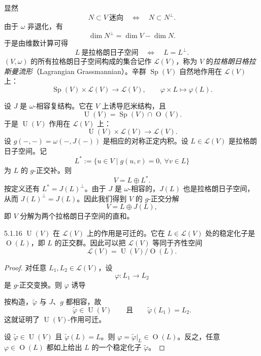 显然
\[
N\subset V\ \text{迷向}\quad\Longleftrightarrow\quad N\subset N^\perp.
\]
由于 $\omega$ 非退化，有
\[
\dim N^\perp=\dim V-\dim N.
\]
于是由维数计算可得
\[
L\ \text{是拉格朗日子空间}\quad\Longleftrightarrow\quad L=L^\perp.
\]
$(V,\omega)$ 的所有拉格朗日子空间构成的集合记作 $\mathcal{L}(V)$，称为 $V$ 的\emph{拉格朗日格拉斯曼流形}（Lagrangian Grassmannian）。辛群 $\operatorname{Sp}(V)$ 自然地作用在 $\mathcal{L}(V)$ 上：
\[
\operatorname{Sp}(V)\times\mathcal{L}(V)\longrightarrow\mathcal{L}(V),\qquad \varphi\times L\longmapsto\varphi(L).
\]


设 $J$ 是 $\omega$-相容复结构。它在 $V$ 上诱导厄米结构，且
\[
\operatorname{U}(V)=\operatorname{Sp}(V)\cap\operatorname{O}(V).
\]
于是 $\operatorname{U}(V)$ 作用在 $\mathcal{L}(V)$ 上：
\[
\operatorname{U}(V)\times\mathcal{L}(V)\longrightarrow\mathcal{L}(V).
\]
设 $g(-,-)=\omega(-,J(-))$ 是相应的对称正定内积。设 $L\in\mathcal{L}(V)$ 是拉格朗日子空间。记
\[
L^*:=\{u\in V\mid g(u,v)=0,\ \forall v\in L\}
\]
为 $L$ 的 $g$-正交补。则
\[
V=L\oplus L^*.
\]
按定义还有 $L^*=J(L)^\perp$。由于 $J$ 是 $\omega$-相容的，$J(L)$ 也是拉格朗日子空间，从而 $J(L)^\perp=J(L)$。因此我们得到 $V$ 的 $g$-正交分解
\[
V=L\oplus J(L),
\]
即 $V$ 分解为两个拉格朗日子空间的直和。

\begin{proposition}{5.1.16}
$\operatorname{U}(V)$ 在 $\mathcal{L}(V)$ 上的作用是可迁的。它在 $L\in\mathcal{L}(V)$ 处的稳定化子是 $\operatorname{O}(L)$，即 $L$ 的正交群。因此可以把 $\mathcal{L}(V)$ 等同于齐性空间
\[
\mathcal{L}(V)=\operatorname{U}(V)/\operatorname{O}(L).
\]
\end{proposition}

\begin{proof}
对任意 $L_1,L_2\in\mathcal{L}(V)$，设
\[
\varphi:L_1\longrightarrow L_2
\]
是 $g$-正交变换。则 $\varphi$ 诱导
\begin{center}
\end{center}
按构造，$\tilde\varphi$ 与 $J$、$g$ 都相容，故
\[
\tilde\varphi\in\operatorname{U}(V)\qquad\text{且}\qquad \tilde\varphi(L_1)=L_2.
\]
这就证明了 $\operatorname{U}(V)$-作用可迁。

设 $\tilde\varphi\in\operatorname{U}(V)$ 且 $\tilde\varphi(L)=L$。则 $\varphi=\tilde\varphi|_L\in\operatorname{O}(L)$。反之，任意 $\varphi\in\operatorname{O}(L)$ 都如上给出 $L$ 的一个稳定化子 $\tilde\varphi$。
\end{proof}


